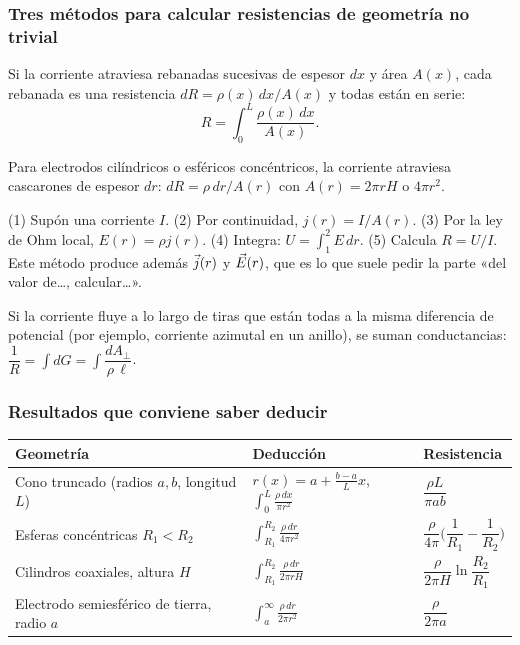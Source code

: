 \documentclass[11pt]{article}
\begin{document}
\subsubsection*{Tres métodos para calcular resistencias de geometría no trivial}
\begin{metodo}
Si la corriente atraviesa rebanadas sucesivas de espesor $dx$ y área $A(x)$, cada rebanada es una resistencia $dR=\rho(x)\,dx/A(x)$ y todas están en serie:
\[
R=\int_0^L\frac{\rho(x)\,dx}{A(x)}.
\]
\end{metodo}
\begin{metodo}
Para electrodos cilíndricos o esféricos concéntricos, la corriente atraviesa cascarones de espesor $dr$: $dR=\rho\,dr/A(r)$ con $A(r)=2\pi rH$ o $4\pi r^2$.
\end{metodo}
\begin{metodo}
(1) Supón una corriente $I$. (2) Por continuidad, $j(r)=I/A(r)$. (3) Por la ley de Ohm local, $E(r)=\rho j(r)$. (4) Integra: $U=\int_1^2 E\,dr$. (5) Calcula $R=U/I$. Este método produce además $\vec{j}(r)$ y $\vec{E}(r)$, que es lo que suele pedir la parte «del valor de\dots, calcular\dots».
\end{metodo}
\begin{metodo}
Si la corriente fluye a lo largo de tiras que están todas a la misma diferencia de potencial (por ejemplo, corriente azimutal en un anillo), se suman conductancias: $\dfrac1R=\int dG=\int\dfrac{dA_\perp}{\rho\,\ell}$.
\end{metodo}

\subsubsection*{Resultados que conviene saber deducir}
\begin{center}
\small
\renewcommand{\arraystretch}{1.6}
\begin{tabular}{@{}lll@{}}
\toprule
Geometría & Deducción & Resistencia\\
\midrule
Cono truncado (radios $a,b$, longitud $L$) & $r(x)=a+\frac{b-a}{L}x$, $\displaystyle\int_0^L\frac{\rho\,dx}{\pi r^2}$ & $\dfrac{\rho L}{\pi ab}$\\
Esferas concéntricas $R_1<R_2$ & $\displaystyle\int_{R_1}^{R_2}\frac{\rho\,dr}{4\pi r^2}$ & $\dfrac{\rho}{4\pi}\Big(\dfrac1{R_1}-\dfrac1{R_2}\Big)$\\
Cilindros coaxiales, altura $H$ & $\displaystyle\int_{R_1}^{R_2}\frac{\rho\,dr}{2\pi rH}$ & $\dfrac{\rho}{2\pi H}\ln\dfrac{R_2}{R_1}$\\
Electrodo semiesférico de tierra, radio $a$ & $\displaystyle\int_a^\infty\frac{\rho\,dr}{2\pi r^2}$ & $\dfrac{\rho}{2\pi a}$\\
\bottomrule
\end{tabular}
\end{center}
\end{document}
